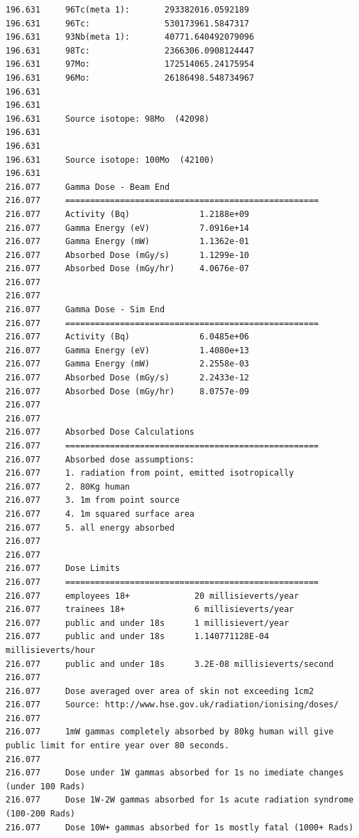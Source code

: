 \begin{lstlisting}[style=sOutputFile,caption={Final results for Molybdenum Irradiation},label={listing:activityv2molybdenum}]
196.631     96Tc(meta 1):       293382016.0592189
196.631     96Tc:               530173961.5847317
196.631     93Nb(meta 1):       40771.640492079096
196.631     98Tc:               2366306.0908124447
196.631     97Mo:               172514065.24175954
196.631     96Mo:               26186498.548734967
196.631     
196.631     
196.631     Source isotope: 98Mo  (42098)
196.631     
196.631     
196.631     Source isotope: 100Mo  (42100)
196.631     
216.077     Gamma Dose - Beam End  
216.077     ===================================================
216.077     Activity (Bq)              1.2188e+09  
216.077     Gamma Energy (eV)          7.0916e+14    
216.077     Gamma Energy (mW)          1.1362e-01   
216.077     Absorbed Dose (mGy/s)      1.1299e-10    
216.077     Absorbed Dose (mGy/hr)     4.0676e-07                
216.077     
216.077     
216.077     Gamma Dose - Sim End
216.077     ===================================================
216.077     Activity (Bq)              6.0485e+06
216.077     Gamma Energy (eV)          1.4080e+13    
216.077     Gamma Energy (mW)          2.2558e-03     
216.077     Absorbed Dose (mGy/s)      2.2433e-12     
216.077     Absorbed Dose (mGy/hr)     8.0757e-09   
216.077     
216.077     
216.077     Absorbed Dose Calculations
216.077     ===================================================
216.077     Absorbed dose assumptions:
216.077     1. radiation from point, emitted isotropically
216.077     2. 80Kg human
216.077     3. 1m from point source
216.077     4. 1m squared surface area
216.077     5. all energy absorbed
216.077     
216.077     
216.077     Dose Limits
216.077     ===================================================
216.077     employees 18+             20 millisieverts/year
216.077     trainees 18+              6 millisieverts/year
216.077     public and under 18s      1 millisievert/year
216.077     public and under 18s      1.140771128E-04 millisieverts/hour
216.077     public and under 18s      3.2E-08 millisieverts/second
216.077     
216.077     Dose averaged over area of skin not exceeding 1cm2
216.077     Source: http://www.hse.gov.uk/radiation/ionising/doses/
216.077     
216.077     1mW gammas completely absorbed by 80kg human will give public limit for entire year over 80 seconds.
216.077     
216.077     Dose under 1W gammas absorbed for 1s no imediate changes (under 100 Rads)
216.077     Dose 1W-2W gammas absorbed for 1s acute radiation syndrome (100-200 Rads)
216.077     Dose 10W+ gammas absorbed for 1s mostly fatal (1000+ Rads)
\end{lstlisting}



